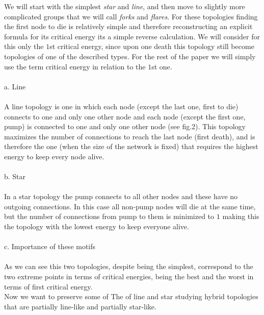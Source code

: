 \documentclass{amsart}
\theoremstyle{plain}
\numberwithin{equation}{section}
\begin{document}
We will start with the simplest \textit{star} and \textit{line}, and then move to slightly more complicated groups that we will call \textit{forks} and \textit{flares}. For these topologies finding the first node to die is relatively simple and therefore reconstructing an explicit formula for its critical energy its a simple reverse calculation. We will consider for this only the $1$st critical energy, since upon one death this topology still become topologies of one of the described types. For the rest of the paper we will simply use the term critical energy in relation to the $1$st one.\\
\\
 a. Line\\
\\
A line topology is one in which each node (except the last one, first to die) connects to one and only one other node and each node (except the first one, pump) is connected to one and only one other node (see fig.2). This topology maximizes the number of connections to reach the last node (first death), and is therefore the one (when the size of the network is fixed) that requires the highest energy to keep every node alive.\\
\\
 b. Star\\
\\
In a star topology the pump connects to all other nodes and these have no outgoing connections.
In this case all non-pump nodes will die at the same time, but the number of connections from pump to them is minimized to $1$ making this the topology with the lowest energy to keep everyone alive.\\
\\
 c. Importance of these motifs\\
\\
As we can see this two topologies, despite being the simplest, correspond to the two extreme points in terms of critical energies, being the best and the worst in terms of first critical energy.\\
Now we want to preserve some of The  of line and star studying hybrid topologies that are partially line-like and partially star-like.
\\
\\
\\
\end{document}
